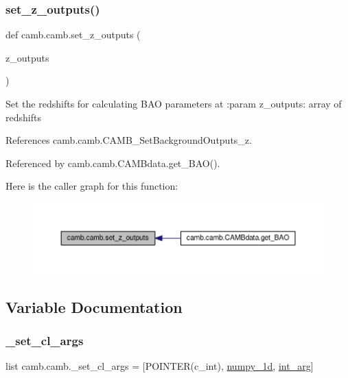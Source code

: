 \subsubsection{\texorpdfstring{set\+\_\+z\+\_\+outputs()}{set\_z\_outputs()}}
{\footnotesize\ttfamily def camb.\+camb.\+set\+\_\+z\+\_\+outputs (\begin{DoxyParamCaption}\item[{}]{z\+\_\+outputs }\end{DoxyParamCaption})}

\begin{DoxyVerb}Set the redshifts for calculating BAO parameters at
:param z_outputs: array of redshifts
\end{DoxyVerb}
 

References camb.\+camb.\+C\+A\+M\+B\+\_\+\+Set\+Background\+Outputs\+\_\+z.



Referenced by camb.\+camb.\+C\+A\+M\+Bdata.\+get\+\_\+\+B\+A\+O().

Here is the caller graph for this function\+:
\nopagebreak
\begin{figure}[H]
\begin{center}
\leavevmode
\includegraphics[width=350pt]{namespacecamb_1_1camb_a1278c06959fade5c036b95daa28b8b11_icgraph}
\end{center}
\end{figure}


\subsection{Variable Documentation}
\mbox{\label{namespacecamb_1_1camb_a95c9caf61a082f47bb7a766bf503e601}} 
\subsubsection{\texorpdfstring{\+\_\+set\+\_\+cl\+\_\+args}{\_set\_cl\_args}}
{\footnotesize\ttfamily list camb.\+camb.\+\_\+set\+\_\+cl\+\_\+args = \mbox{[}P\+O\+I\+N\+T\+ER(c\+\_\+int), \mbox{\hyperlink{namespacecamb_1_1camb_a3d113b2f49bb7733dfa37b76ea4da9b0}{numpy\+\_\+1d}}, \mbox{\hyperlink{namespacecamb_1_1camb_a9e194516acd41f6579011e26d65a6d73}{int\+\_\+arg}}\mbox{]}\hspace{0.3cm}{\ttfamily [private]}}

